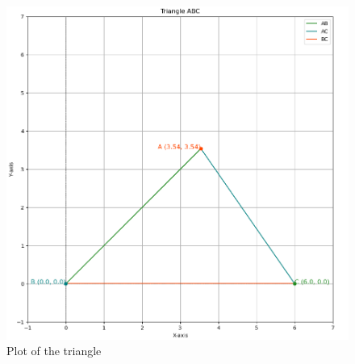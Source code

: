\documentclass[journal]{IEEEtran}
\begin{document}
\begin{figure}[H]
    \centering
    \includegraphics[width=0.7\columnwidth]{figs/Figure_1.png}
    \caption{Plot of the triangle}
    \label{3-3.3-5-fig-0}
\end{figure}
\end{document}
